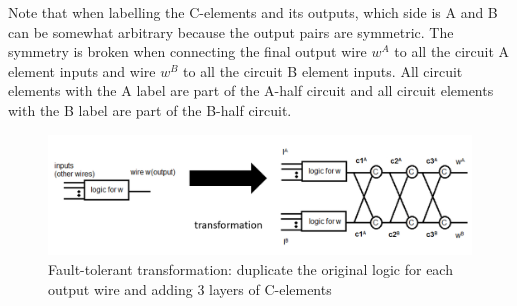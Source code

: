 \documentclass[12pt]{report}
\begin{document}
Note that when labelling the C-elements and its outputs, which side is A and B can be somewhat arbitrary because the output pairs are symmetric.  The symmetry is broken when connecting the final output wire $w^A$ to all the circuit A element inputs and wire $w^B$ to all the circuit B element inputs.  All circuit elements with the A label are part of the A-half circuit and all circuit elements with the B label are part of the B-half circuit.\\%
\begin{figure}
  \centering
    \includegraphics[width=\textwidth]{circuitforproof3}
  \caption[Fault-tolerant transformation of each wire]{Fault-tolerant transformation: duplicate the original logic for each output wire and adding 3 layers of C-elements}
  \label{fig:dupscheme}
\end{figure}
\end{document}
